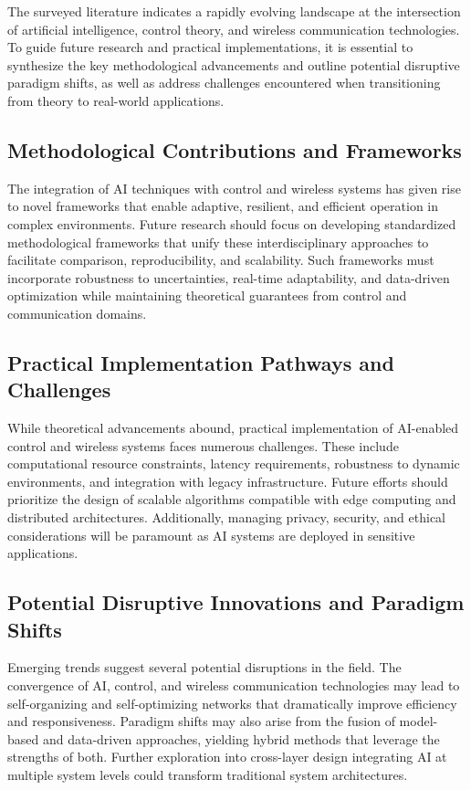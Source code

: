 \documentclass[sigconf]{acmart}
\begin{document}
The surveyed literature indicates a rapidly evolving landscape at the intersection of artificial intelligence, control theory, and wireless communication technologies. To guide future research and practical implementations, it is essential to synthesize the key methodological advancements and outline potential disruptive paradigm shifts, as well as address challenges encountered when transitioning from theory to real-world applications.

\subsection{Methodological Contributions and Frameworks}

The integration of AI techniques with control and wireless systems has given rise to novel frameworks that enable adaptive, resilient, and efficient operation in complex environments. Future research should focus on developing standardized methodological frameworks that unify these interdisciplinary approaches to facilitate comparison, reproducibility, and scalability. Such frameworks must incorporate robustness to uncertainties, real-time adaptability, and data-driven optimization while maintaining theoretical guarantees from control and communication domains.

\subsection{Practical Implementation Pathways and Challenges}

While theoretical advancements abound, practical implementation of AI-enabled control and wireless systems faces numerous challenges. These include computational resource constraints, latency requirements, robustness to dynamic environments, and integration with legacy infrastructure. Future efforts should prioritize the design of scalable algorithms compatible with edge computing and distributed architectures. Additionally, managing privacy, security, and ethical considerations will be paramount as AI systems are deployed in sensitive applications.

\subsection{Potential Disruptive Innovations and Paradigm Shifts}

Emerging trends suggest several potential disruptions in the field. The convergence of AI, control, and wireless communication technologies may lead to self-organizing and self-optimizing networks that dramatically improve efficiency and responsiveness. Paradigm shifts may also arise from the fusion of model-based and data-driven approaches, yielding hybrid methods that leverage the strengths of both. Further exploration into cross-layer design integrating AI at multiple system levels could transform traditional system architectures.
\end{document}
